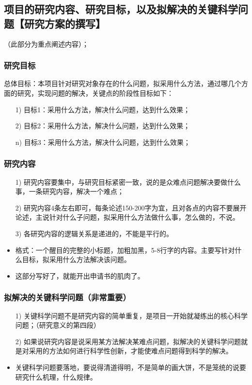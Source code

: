 \subsection{项目的研究内容、研究目标，以及拟解决的关键科学问题【研究方案的撰写】}
（此部分为重点阐述内容）；
\subsubsection{研究目标}
总体目标：本项目针对研究对象存在的什么问题，拟采用什么方法，通过哪几个方面的研究，实现问题的解决，关键点的阶段性目标如下：
\begin{itemize}
\item[1)] 目标1：采用什么方法，解决什么问题，达到什么效果；
\item[2)] 目标2：采用什么方法，解决什么问题，达到什么效果；
\item[n)] 目标3：采用什么方法，解决什么问题，达到什么效果；
\end{itemize}


\subsubsection{研究内容}
\begin{itemize}
\item[1)] 研究内容要集中，与研究目标紧密一致，说的是众难点问题解决要做什么事，一条研究内容，解决一个难点；

\item[2)] 研究内容4条左右即可，每条论述150-200字为宜，且对各点的内容不要展开论述，主说针对什么子问题，拟采用什么方法做什么事，怎么做的，不说。

\item[3)] 各研究内容的逻辑关系是递进的，不能是平行的。

\item 格式：一个醒目的完整的小标题，加粗加黑，5-8行字的内容。主要写针对什么目标，拟采用什么方法解决该问题。

\item {\color{red} 这部分写好了，就能开出申请书的肌肉了。}
\end{itemize}


\subsubsection{拟解决的关键科学问题（非常重要）}
\begin{itemize}
\item[1)]  关键科学问题不是研究内容的简单重复，是项目一开始就凝练出的核心科学问题；（研究意义的第四段）

\item[2)] 如果说研究内容是说采用某方法解决某难点问题，拟解决的关键科学问题就是对采用的方法如何进行科学性创新，才能使难点问题得到科学的解决。

\item 关键科学问题要落地，要说得清道得明，不是简单的画大饼，不是笼统的说要研究什么机理，什么规律。
\end{itemize}





